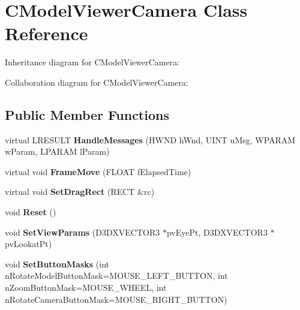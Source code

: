 \hypertarget{class_c_model_viewer_camera}{\section{C\+Model\+Viewer\+Camera Class Reference}
\label{class_c_model_viewer_camera}
}


Inheritance diagram for C\+Model\+Viewer\+Camera\+:


Collaboration diagram for C\+Model\+Viewer\+Camera\+:
\subsection*{Public Member Functions}
\begin{DoxyCompactItemize}
\item 
\hypertarget{class_c_model_viewer_camera_ad50f3bd74420f1ee3c0b6ca9ac3ec348}{virtual L\+R\+E\+S\+U\+L\+T {\bfseries Handle\+Messages} (H\+W\+N\+D h\+Wnd, U\+I\+N\+T u\+Msg, W\+P\+A\+R\+A\+M w\+Param, L\+P\+A\+R\+A\+M l\+Param)}\label{class_c_model_viewer_camera_ad50f3bd74420f1ee3c0b6ca9ac3ec348}

\item 
\hypertarget{class_c_model_viewer_camera_a5309ad1ff0044124c05737da466b7315}{virtual void {\bfseries Frame\+Move} (F\+L\+O\+A\+T f\+Elapsed\+Time)}\label{class_c_model_viewer_camera_a5309ad1ff0044124c05737da466b7315}

\item 
\hypertarget{class_c_model_viewer_camera_aecba47f0c48401639138f602d3ed28bd}{virtual void {\bfseries Set\+Drag\+Rect} (R\+E\+C\+T \&rc)}\label{class_c_model_viewer_camera_aecba47f0c48401639138f602d3ed28bd}

\item 
\hypertarget{class_c_model_viewer_camera_a64f3b265b831578d24faadec70f9dc1b}{void {\bfseries Reset} ()}\label{class_c_model_viewer_camera_a64f3b265b831578d24faadec70f9dc1b}

\item 
\hypertarget{class_c_model_viewer_camera_a3cfc3e0fd350457b4206054c96fc39f7}{void {\bfseries Set\+View\+Params} (D3\+D\+X\+V\+E\+C\+T\+O\+R3 $\ast$pv\+Eye\+Pt, D3\+D\+X\+V\+E\+C\+T\+O\+R3 $\ast$pv\+Lookat\+Pt)}\label{class_c_model_viewer_camera_a3cfc3e0fd350457b4206054c96fc39f7}

\item 
\hypertarget{class_c_model_viewer_camera_a999c8bce2cb411f5b674a81f230dff96}{void {\bfseries Set\+Button\+Masks} (int n\+Rotate\+Model\+Button\+Mask=M\+O\+U\+S\+E\+\_\+\+L\+E\+F\+T\+\_\+\+B\+U\+T\+T\+O\+N, int n\+Zoom\+Button\+Mask=M\+O\+U\+S\+E\+\_\+\+W\+H\+E\+E\+L, int n\+Rotate\+Camera\+Button\+Mask=M\+O\+U\+S\+E\+\_\+\+R\+I\+G\+H\+T\+\_\+\+B\+U\+T\+T\+O\+N)}\label{class_c_model_viewer_camera_a999c8bce2cb411f5b674a81f230dff96}


\end{DoxyCompactItemize}
